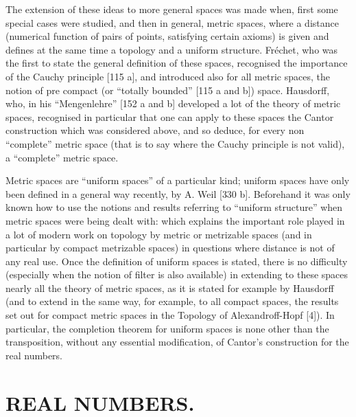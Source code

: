 The extension of these ideas to more general spaces was made when, first some special cases were studied, and then in general, metric spaces, where a distance (numerical function of pairs of points, satisfying certain axioms) is given and defines at the same time a topology and a uniform structure. Fréchet, who was the first to state the general definition of these spaces, recognised the importance of the Cauchy principle {[}115 a{]}, and introduced also for all metric spaces, the notion of pre compact (or ``totally bounded'' {[}115 a and b{]}) space. Hausdorff, who, in his ``Mengenlehre'' {[}152 a and b{]} developed a lot of the theory of metric spaces, recognised in particular that one can apply to these spaces the Cantor construction which was considered above, and so deduce, for every non ``complete'' metric space (that is to say where the Cauchy principle is not valid), a ``complete'' metric space.

Metric spaces are ``uniform spaces'' of a particular kind; uniform spaces have only been defined in a general way recently, by A. Weil {[}330 b{]}. Beforehand it was only known how to use the notions and results referring to ``uniform structure'' when metric spaces were being dealt with: which explains the important role played in a lot of modern work on topology by metric or metrizable spaces (and in particular by compact metrizable spaces) in questions where distance is not of any real use. Once the definition of uniform spaces is stated, there is no difficulty (especially when the notion of filter is also available) in extending to these spaces nearly all the theory of metric spaces, as it is stated for example by Hausdorff (and to extend in the same way, for example, to all compact spaces, the results set out for compact metric spaces in the Topology of Alexandroff-Hopf {[}4{]}). In particular, the completion theorem for uniform spaces is none other than the transposition, without any essential modification, of Cantor's construction for the real numbers.

\chapter{REAL NUMBERS.}

